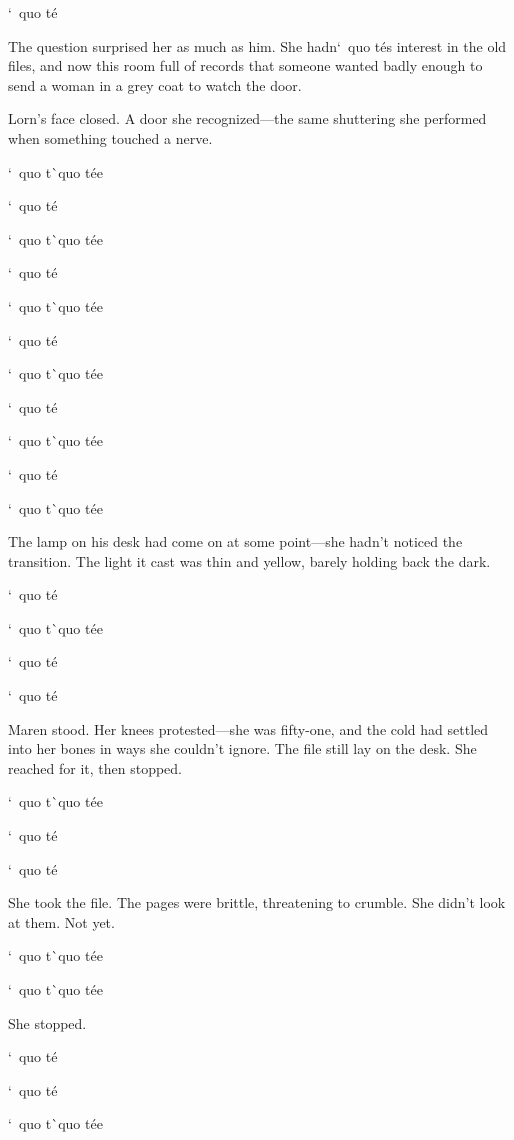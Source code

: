 \documentclass[12pt,letterpaper,openany]{book}
\begin{document}
\par
`\ quo t\'e{}
\par
The question surprised her as much as him. She hadn`\ quo t\'e{}s interest in the old files, and now this room full of records that someone wanted badly enough to send a woman in a grey coat to watch the door.
\par
Lorn's face closed. A door she recognized—the same shuttering she performed when something touched a nerve.
\par
`\ quo t\`\ quo t\'e{}e{}
\par
`\ quo t\'e{}
\par
`\ quo t\`\ quo t\'e{}e{}
\par
`\ quo t\'e{}
\par
`\ quo t\`\ quo t\'e{}e{}
\par
`\ quo t\'e{}
\par
`\ quo t\`\ quo t\'e{}e{}
\par
`\ quo t\'e{}
\par
`\ quo t\`\ quo t\'e{}e{}
\par
`\ quo t\'e{}
\par
`\ quo t\`\ quo t\'e{}e{}
\par
The lamp on his desk had come on at some point—she hadn't noticed the transition. The light it cast was thin and yellow, barely holding back the dark.
\par
`\ quo t\'e{}
\par
`\ quo t\`\ quo t\'e{}e{}
\par
`\ quo t\'e{}
\par
`\ quo t\'e{}
\par
Maren stood. Her knees protested—she was fifty-one, and the cold had settled into her bones in ways she couldn't ignore. The file still lay on the desk. She reached for it, then stopped.
\par
`\ quo t\`\ quo t\'e{}e{}
\par
`\ quo t\'e{}
\par
`\ quo t\'e{}
\par
She took the file. The pages were brittle, threatening to crumble. She didn't look at them. Not yet.
\par
`\ quo t\`\ quo t\'e{}e{}
\par
`\ quo t\`\ quo t\'e{}e{}
\par
She stopped.
\par
`\ quo t\'e{}
\par
`\ quo t\'e{}
\par
`\ quo t\`\ quo t\'e{}e{}
\par
\end{document}
